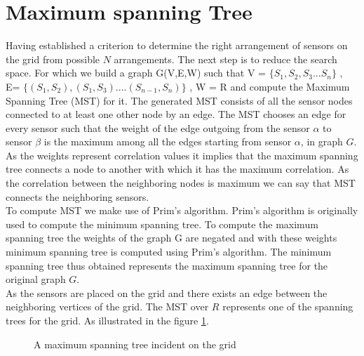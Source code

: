 \section{Maximum spanning Tree}

Having established a criterion to determine the right arrangement of sensors on the grid from  possible ${N}$ arrangements. The next step is to reduce the search space. For which we build a graph G(V,E,W) such that V = $\{S_1,S_2,S_3...S_n\}$ , E= $\{(S_1,S_2),(S_1,S_3)....(S_{n-1},S_n)\}$ , W = R and compute the Maximum Spanning Tree (MST) for it. The generated MST consists of all the sensor nodes connected to at least one other node by an edge. The MST chooses an edge for every sensor such that the weight of the edge outgoing from the sensor $\alpha$ to sensor $\beta$ is the maximum among all the edges starting from sensor $\alpha$, in graph ${G}$. As the weights represent correlation values it implies that the maximum spanning tree connects a node to another with which it has the maximum correlation. As the correlation between the neighboring nodes is maximum we can say that MST connects the neighboring sensors.\\
To compute MST we make use of Prim's algorithm\cite{BLTJ:BLTJ1515}.  Prim's algorithm is originally used to compute the minimum spanning tree. To compute the maximum spanning tree the weights of the graph G are negated and with these weights minimum spanning tree is computed using Prim's algorithm. The minimum spanning tree thus obtained represents the maximum spanning tree for the original graph $G$.\\
As the sensors are placed on the grid and there exists an edge between the neighboring vertices of the grid. The MST over ${R}$ represents one of the spanning trees for the grid. As illustrated in the figure \ref{fig:MST}.

\begin{figure}[!ht]
\qquad \qquad \qquad
{}
\caption{A maximum spanning tree incident on the grid}
\label{fig:MST}
\end{figure}




